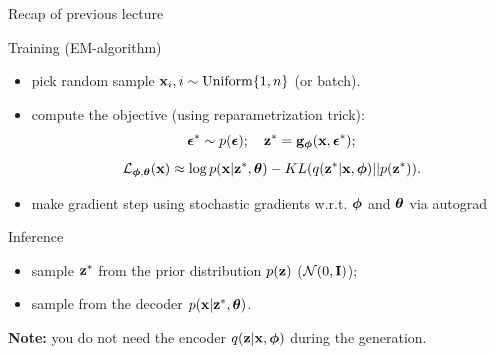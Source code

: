 \begin{frame}{Recap of previous lecture}
	\begin{block}{Training (EM-algorithm)}
		\begin{itemize}
			\item pick random sample $\mathbf{x}_i, i \sim \text{Uniform}\{1, n\}$ (or batch).
			\item compute the objective (using reparametrization trick):
			\vspace{-0.3cm}
			\[
				\boldsymbol{\epsilon}^* \sim p(\boldsymbol{\epsilon}); \quad \mathbf{z}^* = \mathbf{g}_{\boldsymbol{\phi}}(\mathbf{x}, \boldsymbol{\epsilon}^*);
			\]
			\[
				\mathcal{L}_{\boldsymbol{\phi}, \boldsymbol{\theta}}(\mathbf{x}) \approx  \log p(\mathbf{x} | \mathbf{z}^*, \boldsymbol{\theta}) - KL(q(\mathbf{z}^* | \mathbf{x}, \boldsymbol{\phi}) || p(\mathbf{z}^*)).
			\]
			\item make gradient step using stochastic gradients w.r.t. $\boldsymbol{\phi}$ and $\boldsymbol{\theta}$ via autograd
		\end{itemize}
	\end{block}
	\begin{block}{Inference}
		\begin{itemize}
			\item sample $\mathbf{z}^*$ from the prior distribution $p(\mathbf{z})$ ($\mathcal{N}(0, \mathbf{I})$);
			\item sample from the decoder $p(\mathbf{x} | \mathbf{z}^*, \boldsymbol{\theta})$.
		\end{itemize}
	\end{block}
	\textbf{Note:} you do not need the encoder $q(\mathbf{z} | \mathbf{x}, \boldsymbol{\phi})$ during the generation.
\end{frame}
